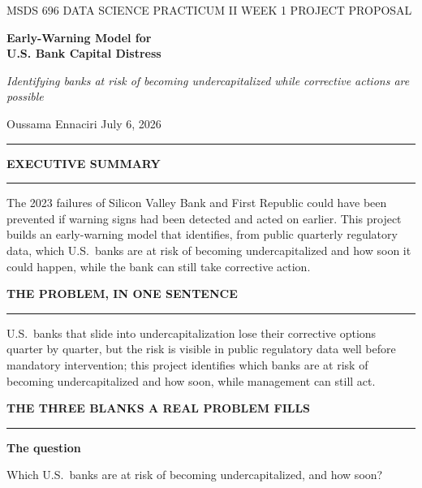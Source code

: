 \documentclass[11pt,letterpaper]{article}
\newcommand{\sectionhead}[1]{%
  \vspace{6pt}%
  {\sffamily\bfseries\fontsize{9.5}{12}\selectfont\color{navy}\MakeUppercase{#1}}\par
  \vspace{-9pt}\textcolor{hairline}{\rule{\textwidth}{0.5pt}}\par\vspace{0pt}}
\newcommand{\sublabel}[1]{{\sffamily\bfseries\fontsize{9}{11}\selectfont\color{midgray}#1}\par\vspace{2pt}}
\newcommand{\answer}[1]{#1\par\vspace{3pt}}
\begin{document}
\vspace*{-14pt}
{\sffamily\fontsize{8.5}{11}\selectfont\color{midgray}MSDS 696 DATA SCIENCE PRACTICUM II \quad\textbar\quad WEEK 1 PROJECT PROPOSAL}\par\vspace{10pt}
{\sffamily\bfseries\fontsize{21}{25}\selectfont\color{navy}Early-Warning Model for\\U.S. Bank Capital Distress}\par\vspace{6pt}
{\fontsize{12}{16}\selectfont\itshape\color{midgray}Identifying banks at risk of becoming undercapitalized while corrective actions are possible}\par\vspace{9pt}
{\sffamily\fontsize{9}{12}\selectfont Oussama Ennaciri \quad\textbar\quad July 6, 2026}\par\vspace{5pt}
\textcolor{navy}{\rule{\textwidth}{1.2pt}}

\sectionhead{Executive summary}
\answer{The 2023 failures of Silicon Valley Bank and First Republic could have been prevented if warning signs had been detected and acted on earlier. This project builds an early-warning model that identifies, from public quarterly regulatory data, which U.S.\ banks are at risk of becoming undercapitalized and how soon it could happen, while the bank can still take corrective action.}

\sectionhead{The problem, in one sentence}
\answer{U.S.\ banks that slide into undercapitalization lose their corrective options quarter by quarter, but the risk is visible in public regulatory data well before mandatory intervention; this project identifies which banks are at risk of becoming undercapitalized and how soon, while management can still act.}

\sectionhead{The three blanks a real problem fills}

\sublabel{The question}
\answer{Which U.S.\ banks are at risk of becoming undercapitalized, and how soon?}
\end{document}
